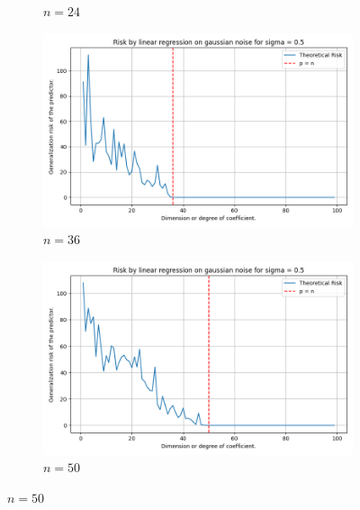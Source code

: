 \documentclass[twoside,10pt]{article}
\begin{document}
\begin{figure}[htb]
\begin{subfigure}[b]{\imgwidth}
    \caption{$n=24$}\label{fig:1b21}
  \end{subfigure}%
  \hfill
  \begin{subfigure}[b]{\imgwidth}
    \includegraphics[width=\linewidth]{img/descent_devel_t3.png}
    \caption{$n=36$}\label{fig:1c21}
  \end{subfigure}%
  \hfill
  \begin{subfigure}[b]{\imgwidth}
    \includegraphics[width=\linewidth]{img/descent_devel_t4.png}
    \caption{$n=50$}\label{fig:1d21}
  \end{subfigure}

  \medskip


\end{figure}
\end{document}
